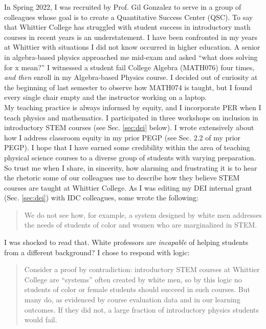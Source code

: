 \documentclass[../../../main.tex]{subfiles}
\begin{document}
\label{sec:qsc}

In Spring 2022, I was recruited by Prof. Gil Gonzalez to serve in a group of colleagues whose goal is to create a Quantitative Success Center (QSC).  To say that Whittier College has struggled with student success in introductory math courses in recent years is an understatement.  I have been confronted in my years at Whittier with situations I did not know occurred in higher education.  A senior in algebra-based physics approached me mid-exam and asked ``what does solving for x mean?'' I witnessed a student fail College Algebra (MATH076) four times, \textit{and then} enroll in my Algebra-based Physics course.  I decided out of curiosity at the beginning of last semester to observe how MATH074 is taught, but I found every single chair empty and the instructor working on a laptop.
\\
\vspace{0.25cm}
My teaching practice is always informed by equity, and I incorporate PER when I teach physics and mathematics.  I participated in three workshops on inclusion in introductory STEM courses (see Sec. \ref{sec:dei} below).  I wrote extensively about how I address classroom equity in my prior PEGP (see Sec. 2.2 of my prior PEGP).  I hope that I have earned some credibility within the area of teaching physical science courses to a diverse group of students with varying preparation.  So trust me when I share, in sincerity, how alarming and frustrating it is to hear the rhetoric some of our colleagues use to describe how they believe STEM courses are taught at Whittier College.  As I was editing my DEI internal grant (Sec. \ref{sec:dei}) with IDC colleagues, some wrote the following:

\begin{quotation}
We do not see how, for example, a system designed by white men addresses the needs of students of color and women who are marginalized in STEM.
\end{quotation}

I was shocked to read that.  White professors are \textit{incapable} of helping students from a different background?  I chose to respond with logic:

\begin{quotation}
Consider a proof by contradiction: introductory STEM courses at Whittier College are ``systems'' often created by white men, so by this logic no students of color or female students should succeed in such courses.  But many do, as evidenced by course evaluation data and in our learning outcomes. If they did not, a large fraction of introductory physics students would fail.
\end{quotation}
\end{document}
